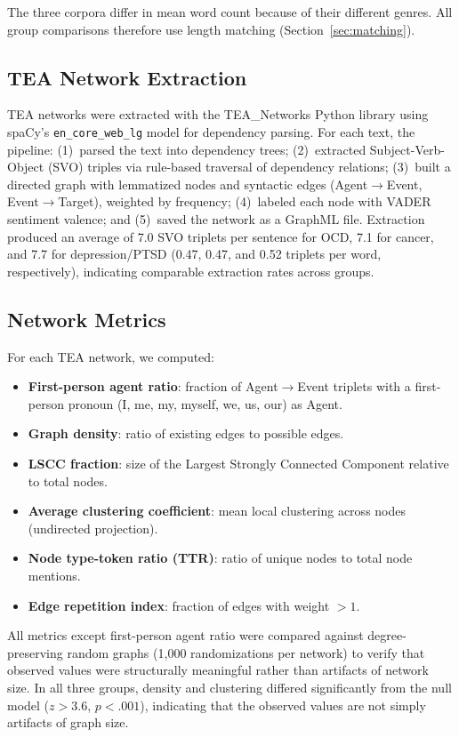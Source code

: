 \documentclass[11pt,a4paper]{article}
\begin{document}
The three corpora differ in mean word count because of their different genres. All group comparisons therefore use length matching (Section~\ref{sec:matching}).

\subsection{TEA Network Extraction}

TEA networks were extracted with the TEA\_Networks Python library \citep[version 0.3.1]{franchini2026tea} using spaCy's \texttt{en\_core\_web\_lg} model for dependency parsing. For each text, the pipeline: (1)~parsed the text into dependency trees; (2)~extracted Subject-Verb-Object (SVO) triples via rule-based traversal of dependency relations; (3)~built a directed graph with lemmatized nodes and syntactic edges (Agent$\to$Event, Event$\to$Target), weighted by frequency; (4)~labeled each node with VADER sentiment valence; and (5)~saved the network as a GraphML file. Extraction produced an average of 7.0 SVO triplets per sentence for OCD, 7.1 for cancer, and 7.7 for depression/PTSD (0.47, 0.47, and 0.52 triplets per word, respectively), indicating comparable extraction rates across groups.

\subsection{Network Metrics}

For each TEA network, we computed:

\begin{itemize}
\item \textbf{First-person agent ratio}: fraction of Agent$\to$Event triplets with a first-person pronoun (I, me, my, myself, we, us, our) as Agent.
\item \textbf{Graph density}: ratio of existing edges to possible edges.
\item \textbf{LSCC fraction}: size of the Largest Strongly Connected Component relative to total nodes.
\item \textbf{Average clustering coefficient}: mean local clustering across nodes (undirected projection).
\item \textbf{Node type-token ratio (TTR)}: ratio of unique nodes to total node mentions.
\item \textbf{Edge repetition index}: fraction of edges with weight $> 1$.
\end{itemize}

All metrics except first-person agent ratio were compared against degree-preserving random graphs (1,000 randomizations per network) to verify that observed values were structurally meaningful rather than artifacts of network size. In all three groups, density and clustering differed significantly from the null model ($z > 3.6$, $p < .001$), indicating that the observed values are not simply artifacts of graph size.
\end{document}

